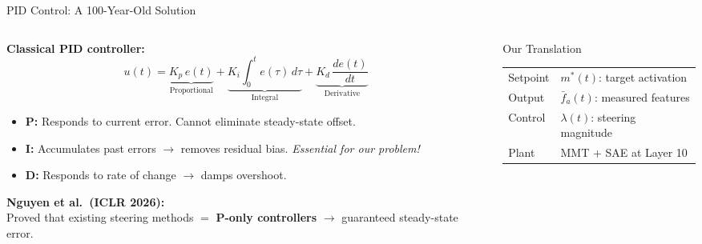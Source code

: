 \documentclass[aspectratio=169, 11pt]{beamer}
\begin{document}
\begin{frame}{PID Control: A 100-Year-Old Solution}

\begin{columns}[T]
\begin{column}{0.55\textwidth}

\textbf{Classical PID controller:}
$$u(t) = \underbrace{K_p \, e(t)}_{\text{Proportional}} + \underbrace{K_i \!\int_0^t\! e(\tau)\,d\tau}_{\text{Integral}} + \underbrace{K_d \,\frac{de(t)}{dt}}_{\text{Derivative}}$$

\vspace{0.3em}
\begin{itemize}
  \item \textbf{P:} Responds to current error. Cannot eliminate steady-state offset.
  \item \textbf{I:} Accumulates past errors $\to$ removes residual bias. \emph{Essential for our problem!}
  \item \textbf{D:} Responds to rate of change $\to$ damps overshoot.
\end{itemize}

\vspace{0.5em}
\textbf{Nguyen et al.\ (ICLR 2026):}\\
Proved that existing steering methods $=$ \textbf{P-only controllers} $\to$ guaranteed steady-state error.
\end{column}

\begin{column}{0.42\textwidth}

\vspace{0.5em}
\begin{block}{Our Translation}
\small
\begin{tabular}{ll}
Setpoint & $m^*(t)$: target activation \\
Output & $\bar{f}_a(t)$: measured features \\
Control & $\lambda(t)$: steering magnitude \\
Plant & MMT + SAE at Layer 10 \\
\end{tabular}
\end{block}
\end{column}
\end{columns}


\end{frame}
\end{document}
